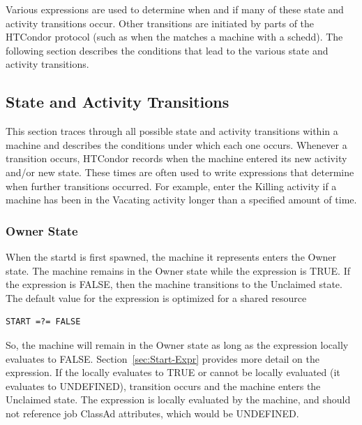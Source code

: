 Various expressions are used to determine when and if many of these
state and activity transitions occur.  Other transitions are initiated
by parts of the HTCondor protocol (such as when the 
matches a machine with a schedd).  The following section describes the
conditions that lead to the various state and activity transitions.

\subsection{\label{sec:State-and-Activity-Transitions}
State and Activity Transitions}

This section traces through all possible state and activity
transitions within a machine and describes the conditions under which
each one occurs.
Whenever a transition occurs, HTCondor records when the machine entered its
new activity and/or new state.
These times are often used to write expressions that determine
when further transitions occurred.
For example, enter the Killing activity if a machine has been in
the Vacating activity longer than a specified amount of time. 

\subsubsection{\label{sec:Owner-State}
Owner State}

When the startd is first spawned, the machine it represents enters the
Owner state. 
The machine remains in the Owner state while the
expression  is TRUE.
If the  expression is FALSE,
then the machine transitions to the Unclaimed state.
The default value for the 
 expression is optimized for a shared resource
\begin{verbatim}
START =?= FALSE
\end{verbatim}
So,
the machine will remain in the Owner state as long as the 
expression locally evaluates to FALSE.
Section~\ref{sec:Start-Expr} provides more detail on the
 expression.
If the  locally evaluates to TRUE or cannot be locally
evaluated (it evaluates to UNDEFINED), transition 
occurs and the machine enters the Unclaimed state.
The  expression is locally evaluated by the machine,
and should not reference job ClassAd attributes, which would be
UNDEFINED.

